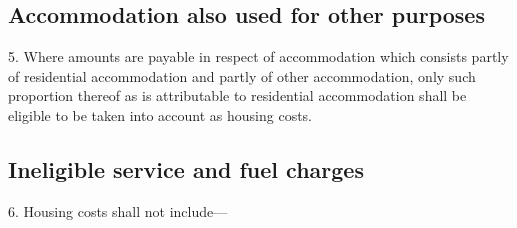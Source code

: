 \documentclass[12pt,a4paper]{article}
\begin{document}
\subsection*{Accommodation also used for other purposes}

5.  Where amounts are payable in respect of accommodation which consists partly of residential accommodation and partly of other accommodation, only such proportion thereof as is attributable to residential accommodation shall be eligible to be taken into account as housing costs.

\subsection*{Ineligible service and fuel charges}

6.  Housing costs shall not include—
\end{document}

